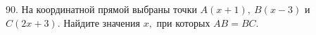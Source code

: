 90. На координатной прямой выбраны точки $A(x + 1),\ B(x - 3)$ и $C(2x + 3).$ Найдите значения $x,$ при которых $AB = BC.$\\
